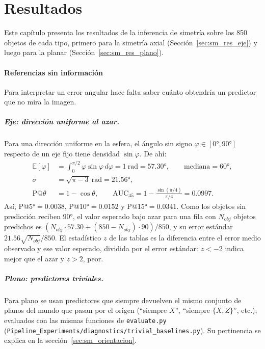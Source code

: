 

\chapter{Resultados}
\label{cap:resultados}

Este capítulo presenta los resultados de la inferencia de simetría sobre los 850 objetos
de cada tipo, primero para la simetría axial (Sección~\ref{sec:sm_res_eje}) y
luego para la planar (Sección~\ref{sec:sm_res_plano}). 



\newpage


\newpage
\subsubsection{Referencias sin información}
\label{sec:sm_azar}

Para interpretar un error angular hace falta saber cuánto obtendría un
predictor que no mira la imagen.

\paragraph{Eje: dirección uniforme al azar.} Para una dirección uniforme en la
esfera, el ángulo sin signo $\varphi\in[0°,90°]$ respecto de un eje fijo tiene
densidad $\sin\varphi$. De ahí:
\begin{align}
  \mathbb{E}[\varphi] &= \int_0^{\pi/2}\varphi\sin\varphi\,d\varphi = 1\ \text{rad} = 57.30°,
  \qquad \text{mediana} = 60°, \\
  \sigma &= \sqrt{\pi-3}\ \text{rad} = 21.56°, \\
  \text{P@}\theta &= 1-\cos\theta,
  \qquad \text{AUC}_{45} = 1-\frac{\sin(\pi/4)}{\pi/4} = 0.0997.
\end{align}
Así, P@5°$=0.0038$, P@10°$=0.0152$ y P@15°$=0.0341$. Como los objetos sin
predicción reciben $90°$, el valor esperado bajo azar para una fila con $N_{obj}$
objetos predichos es $(N_{obj}\cdot 57.30 + (850-N_{obj})\cdot 90)/850$, y su error
estándar $21.56\sqrt{N_{obj}}/850$. El estadístico $z$ de las tablas es la
diferencia entre el error medio observado y ese valor esperado, dividida por el
error estándar: $z<-2$ indica mejor que el azar y $z>2$, peor.

\paragraph{Plano: predictores triviales.} Para plano se usan predictores que
siempre devuelven el mismo conjunto de planos del mundo que pasan por el
origen (``siempre $X$'', ``siempre $\{X,Z\}$'', etc.), evaluados con las mismas
funciones de \texttt{evaluate.py}
(\texttt{Pipeline\_Experiments/diagnostics/trivial\_baselines.py}). Su
pertinencia se explica en la sección~\ref{sec:sm_orientacion}.

